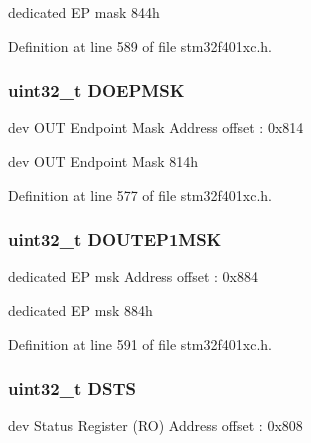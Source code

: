 dedicated EP mask 844h 

Definition at line 589 of file stm32f401xc.\+h.

\subsubsection[{\texorpdfstring{D\+O\+E\+P\+M\+SK}{DOEPMSK}}]{ uint32\+\_\+t D\+O\+E\+P\+M\+SK}\hypertarget{struct_u_s_b___o_t_g___device_type_def_a11dbd3f7a82b3f3b91621321d3018e0a}{}\label{struct_u_s_b___o_t_g___device_type_def_a11dbd3f7a82b3f3b91621321d3018e0a}
dev O\+UT Endpoint Mask Address offset \+: 0x814

dev O\+UT Endpoint Mask 814h 

Definition at line 577 of file stm32f401xc.\+h.

\subsubsection[{\texorpdfstring{D\+O\+U\+T\+E\+P1\+M\+SK}{DOUTEP1MSK}}]{ uint32\+\_\+t D\+O\+U\+T\+E\+P1\+M\+SK}\hypertarget{struct_u_s_b___o_t_g___device_type_def_a196e86fc15ba228188d47468349de69b}{}\label{struct_u_s_b___o_t_g___device_type_def_a196e86fc15ba228188d47468349de69b}
dedicated EP msk Address offset \+: 0x884

dedicated EP msk 884h 

Definition at line 591 of file stm32f401xc.\+h.

\subsubsection[{\texorpdfstring{D\+S\+TS}{DSTS}}]{ uint32\+\_\+t D\+S\+TS}\hypertarget{struct_u_s_b___o_t_g___device_type_def_a8371acd36203fa875cdea3f29b94d1fb}{}\label{struct_u_s_b___o_t_g___device_type_def_a8371acd36203fa875cdea3f29b94d1fb}
dev Status Register (RO) Address offset \+: 0x808

